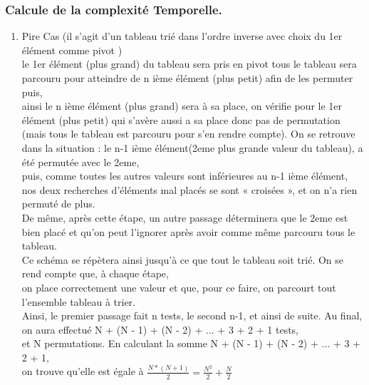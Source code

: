 \documentclass[12pt]{article}
\begin{document}
\subsubsection{Calcule de la complexité Temporelle. }
\begin{enumerate}
	\item Pire Cas
	(il s'agit d'un tableau trié dans l'ordre inverse avec choix du 1er élément comme pivot )\\
	
		le 1er élément (plus grand) du tableau sera pris en pivot tous le tableau sera parcouru pour atteindre de n ième élément (plus petit) afin de les permuter puis,\\
		
		ainsi le n ième élément (plus grand) sera à sa place, on vérifie pour le 1er élément (plus petit) qui s'avère aussi a sa place donc pas de permutation 
		(mais tous le tableau est parcouru pour s'en rendre compte).
		On se retrouve dans la situation : le n-1 ième élément(2eme plus grande valeur du tableau), a été permutée avec le 2eme,\\
		
		puis, comme toutes les autres valeurs sont inférieures au n-1 ième élément, nos deux recherches d'éléments mal placés se sont « croisées »,
		et on n'a rien permuté de plus.\\
		
	De même, après cette étape, un autre passage déterminera que le 2eme est bien placé et qu'on peut l'ignorer après avoir comme même parcouru tous le tableau.\\
	
	Ce schéma se répètera ainsi jusqu'à ce que tout le tableau soit trié. On se rend compte que, à chaque étape,\\
	
	on place correctement une valeur et que, pour ce faire, on parcourt tout l'ensemble tableau à trier. \\
	
	
	Ainsi, le premier passage fait n tests, le second n-1, et ainsi de suite. Au final, on aura effectué \color{blue}  N + (N - 1) + (N - 2) + ... + 3 + 2 + 1 tests,\color{black}\\
	 
	et N permutations. En calculant la somme \color{blue} N + (N - 1) + (N - 2) + ... + 3 + 2 + 1, \color{black}\\
	 on trouve qu'elle est égale à \color{blue} $\frac{N*(N+1)}{2} = \frac{N^2}{2} + \frac{N}{2}$\\
	\color{black}
	

\end{enumerate}
\end{document}

